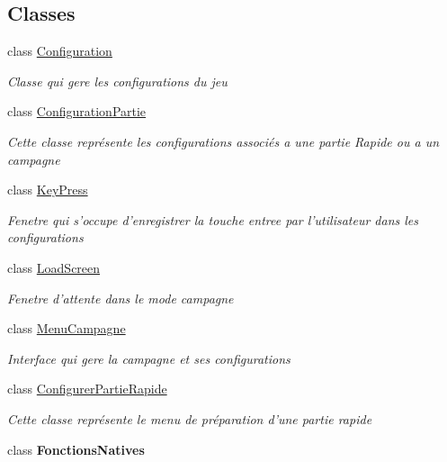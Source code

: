 \subsection*{Classes}
\begin{DoxyCompactItemize}
\item 
class \hyperlink{class_interface_graphique_1_1_configuration}{Configuration}
\begin{DoxyCompactList}\small\item\em Classe qui gere les configurations du jeu \end{DoxyCompactList}\item 
class \hyperlink{class_interface_graphique_1_1_configuration_partie}{Configuration\-Partie}
\begin{DoxyCompactList}\small\item\em Cette classe représente les configurations associés a une partie Rapide ou a un campagne \end{DoxyCompactList}\item 
class \hyperlink{class_interface_graphique_1_1_key_press}{Key\-Press}
\begin{DoxyCompactList}\small\item\em Fenetre qui s'occupe d'enregistrer la touche entree par l'utilisateur dans les configurations \end{DoxyCompactList}\item 
class \hyperlink{class_interface_graphique_1_1_load_screen}{Load\-Screen}
\begin{DoxyCompactList}\small\item\em Fenetre d'attente dans le mode campagne \end{DoxyCompactList}\item 
class \hyperlink{class_interface_graphique_1_1_menu_campagne}{Menu\-Campagne}
\begin{DoxyCompactList}\small\item\em Interface qui gere la campagne et ses configurations \end{DoxyCompactList}\item 
class \hyperlink{class_interface_graphique_1_1_configurer_partie_rapide}{Configurer\-Partie\-Rapide}
\begin{DoxyCompactList}\small\item\em Cette classe représente le menu de préparation d'une partie rapide \end{DoxyCompactList}\item 
class {\bfseries Fonctions\-Natives}
\item 

\end{DoxyCompactItemize}
